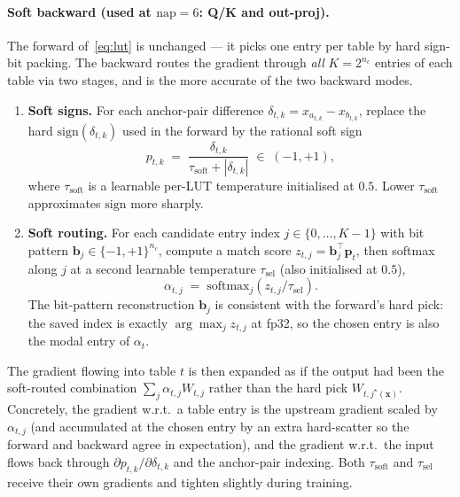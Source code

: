 \documentclass[11pt]{article}
\begin{document}
\paragraph{Soft backward (used at $\text{nap}=6$: Q/K and out-proj).}
The forward of~\eqref{eq:lut} is unchanged --- it picks one entry per table by hard sign-bit packing.
The backward routes the gradient through \emph{all} $K = 2^{n_c}$ entries of each table via two stages, and is the more accurate of the two backward modes.
\begin{enumerate}
\setlength{\itemsep}{1pt}
    \item \textbf{Soft signs.} For each anchor-pair difference $\delta_{t,k} = x_{a_{t,k}} - x_{b_{t,k}}$, replace the hard $\mathrm{sign}(\delta_{t,k})$ used in the forward by the rational soft sign
    \begin{equation}
        p_{t,k} \;=\; \frac{\delta_{t,k}}{\tau_{\text{soft}} + |\delta_{t,k}|} \;\in\; (-1, +1),
    \end{equation}
    where $\tau_{\text{soft}}$ is a learnable per-LUT temperature initialised at $0.5$.
    Lower $\tau_{\text{soft}}$ approximates $\mathrm{sign}$ more sharply.
    \item \textbf{Soft routing.} For each candidate entry index $j \in \{0, \ldots, K - 1\}$ with bit pattern $\mathbf{b}_j \in \{-1, +1\}^{n_c}$, compute a match score $z_{t,j} = \mathbf{b}_j^\top \mathbf{p}_t$, then softmax along $j$ at a second learnable temperature $\tau_{\text{sel}}$ (also initialised at $0.5$),
    \begin{equation}
        \alpha_{t,j} \;=\; \mathrm{softmax}_j (z_{t,j} / \tau_{\text{sel}}).
    \end{equation}
    The bit-pattern reconstruction $\mathbf{b}_j$ is consistent with the forward's hard pick: the saved index is exactly $\arg\max_j z_{t,j}$ at fp32, so the chosen entry is also the modal entry of $\alpha_t$.
\end{enumerate}
The gradient flowing into table $t$ is then expanded as if the output had been the soft-routed combination $\sum_j \alpha_{t,j} W_{t,j}$ rather than the hard pick $W_{t, j^\star(\mathbf{x})}$.
Concretely, the gradient w.r.t.\ a table entry is the upstream gradient scaled by $\alpha_{t,j}$ (and accumulated at the chosen entry by an extra hard-scatter so the forward and backward agree in expectation), and the gradient w.r.t.\ the input flows back through $\partial p_{t,k} / \partial \delta_{t,k}$ and the anchor-pair indexing.
Both $\tau_{\text{soft}}$ and $\tau_{\text{sel}}$ receive their own gradients and tighten slightly during training.
\end{document}
